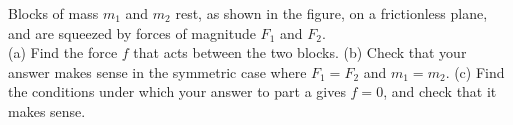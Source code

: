 Blocks of mass $m_1$ and $m_2$ rest, as shown in the figure, on a frictionless plane,
and are squeezed by forces of magnitude $F_1$ and $F_2$.\\
(a) Find the force $f$ that acts between the two blocks.\answercheck\hwendpart
(b) Check that your answer makes sense in the symmetric case where $F_1=F_2$
and $m_1=m_2$.\hwendpart
(c) Find the conditions under which your answer to part a gives $f=0$, and
check that it makes sense.\hwendpart

